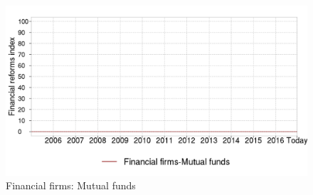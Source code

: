 \documentclass[a4paper,12pt,leqno]{article}
\begin{document}
\begin{figure}[H]
  \caption{Financial firms: Mutual funds}
  \centering
  \includegraphics[width=0.65\paperwidth,height=0.45\paperwidth]{../GRAPHS/frm_index_financial_firms_mutual_funds.png}
\end{figure}
\end{document}
